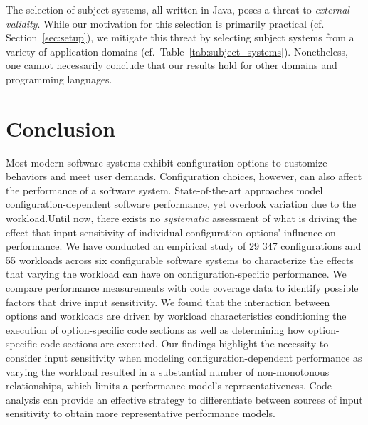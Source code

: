 The selection of subject systems, all written in Java, poses a threat to \emph{external validity}. While our motivation for this selection is primarily practical (cf. Section~\ref{sec:setup}), we mitigate this threat by selecting subject systems from a variety of application domains (cf.~Table~\ref{tab:subject_systems}). Nonetheless, one cannot necessarily conclude that our results hold for other domains and programming languages. 

\section{Conclusion}\label{sec:conclusion}
Most modern software systems exhibit configuration options to customize behaviors and meet user demands. Configuration choices, however, can also affect the performance of a software system.
State-of-the-art approaches model configuration-dependent software performance, yet overlook variation due to the workload.Until now, there exists no \textit{systematic} assessment of what is driving the effect that input sensitivity of individual configuration options’ influence on performance. We have conducted an empirical study of 29 347 configurations and 55 workloads across six configurable software systems to characterize the effects that varying the workload can have on configuration-specific performance. We compare performance measurements with code coverage data to identify possible factors that drive input sensitivity. We found that the interaction between options and workloads are driven by workload characteristics conditioning the execution of option-specific code sections as well as determining how option-specific code sections are executed. Our findings highlight the necessity to consider input sensitivity when modeling configuration-dependent performance as varying the workload resulted in a substantial number of non-monotonous relationships, which limits a performance model's representativeness. Code analysis can provide an effective strategy to differentiate between sources of input sensitivity to obtain more representative performance models.

